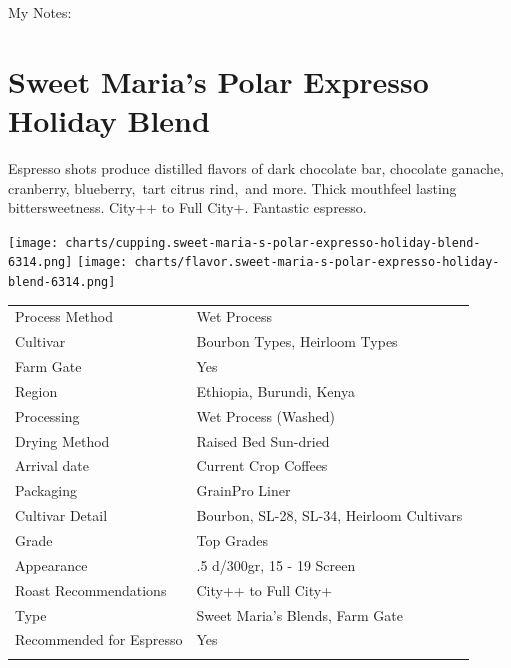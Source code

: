 \documentclass[10pt,twoside,footinclude=true,headinclude=true]{scrbook} %
\newlength{\mysize}
\newcommand{\myfontsize}[1]{
  \setlength{\mysize}{#1pt}
  \fontsize{\mysize}{1.2\mysize}
  \selectfont
}
\begin{document}
\medskip
\normalsize
My Notes:


\linespread{1.3}
\chapter*{Sweet Maria's Polar Expresso Holiday Blend}
 
\begin{addmargin}[2.2em]{2.2em}
\small
\justify
Espresso shots produce distilled flavors of dark chocolate bar, chocolate ganache, cranberry, blueberry, tart citrus rind, and more. Thick mouthfeel lasting bittersweetness. City++ to Full City+. Fantastic espresso.
\end{addmargin}

\centering
\vspace{2em}
\texttt{[image: charts/cupping.sweet-maria-s-polar-expresso-holiday-blend-6314.png]}
\texttt{[image: charts/flavor.sweet-maria-s-polar-expresso-holiday-blend-6314.png]}

\vspace{1em}
\begin{table}[htbp]
\myfontsize{7}
\hspace*{2.2em}
\begin{tabular}{ >{\raggedleft\arraybackslash}p{3.6cm}!{\color{lightgray}\vrule}p{7cm} }
\hline
  Process Method & Wet Process \\
  \hline
  Cultivar & Bourbon Types, Heirloom Types \\
  \hline
  Farm Gate & Yes \\
  \hline
  Region & Ethiopia, Burundi, Kenya \\
  \hline
  Processing & Wet Process (Washed) \\
  \hline
  Drying Method & Raised Bed Sun-dried \\
  \hline
  Arrival date & Current Crop Coffees \\
  \hline
  Packaging & GrainPro Liner \\
  \hline
  Cultivar Detail & Bourbon, SL-28, SL-34, Heirloom Cultivars \\
  \hline
  Grade & Top Grades \\
  \hline
  Appearance & .5 d/300gr, 15 - 19 Screen \\
  \hline
  Roast Recommendations & City++ to Full City+ \\
  \hline
  Type & Sweet Maria's Blends, Farm Gate \\
  \hline
  Recommended for Espresso & Yes \\
  \hline

\end{tabular}
\end{table}
\end{document}

